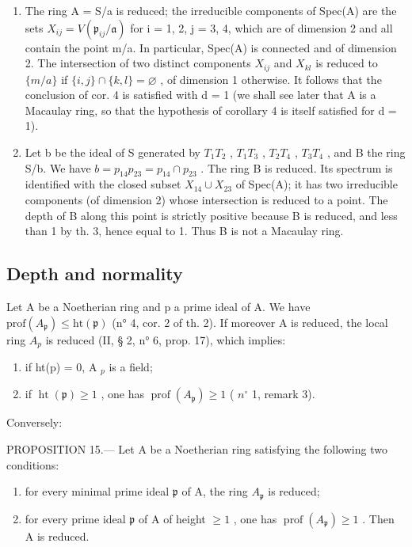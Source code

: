 \begin{enumerate}
\def\labelenumi{\alph{enumi})}
\item
  The ring A = S/a is reduced; the irreducible components of Spec(A) are the sets \(X_{ij} = V(\mathfrak{p}_{ij}/\mathfrak{a})\) for i = 1, 2, j = 3, 4, which are of dimension 2 and all contain the point m/a. In particular, Spec(A) is connected and of dimension 2. The intersection of two distinct components \(X_{ij}\) and \(X_{kl}\) is reduced to \(\{m/a\}\) if \(\{i,j\} \cap \{k,l\} = \varnothing\) , of dimension 1 otherwise. It follows that the conclusion of cor. 4 is satisfied with d = 1 (we shall see later that A is a Macaulay ring, so that the hypothesis of corollary 4 is itself satisfied for d = 1).
\item
  Let b be the ideal of S generated by \(T_{1}T_{2}\) , \(T_{1}T_{3}\) , \(T_{2}T_{4}\) , \(T_{3}T_{4}\) , and B the ring S/b. We have \(b = p_{14}p_{23} = p_{14} \cap p_{23}\) . The ring B is reduced. Its spectrum is identified with the closed subset \(X_{14} \cup X_{23}\) of Spec(A); it has two irreducible components (of dimension 2) whose intersection is reduced to a point. The depth of B along this point is strictly positive because B is reduced, and less than 1 by th. 3, hence equal to 1. Thus B is not a Macaulay ring.
\end{enumerate}

\subsection{Depth and normality}

Let A be a Noetherian ring and p a prime ideal of A. We have \(\text{prof}(A_{\mathfrak{p}}) \leqslant \text{ht}(\mathfrak{p})\) (n° 4, cor. 2 of th. 2). If moreover A is reduced, the local ring \(A_{p}\) is reduced (II, § 2, n° 6, prop. 17), which implies:

\begin{enumerate}
\def\labelenumi{\alph{enumi})}
\item
  if ht(p) = 0, A \(_{p}\) is a field;
\item
  if \(\operatorname{ht}(\mathfrak{p}) \geqslant 1\) , one has \(\operatorname{prof}(A_{\mathfrak{p}}) \geqslant 1\) ( \(n^{\circ}\) 1, remark 3).
\end{enumerate}

Conversely:

PROPOSITION 15.--- Let A be a Noetherian ring satisfying the following two conditions:

\begin{enumerate}
\def\labelenumi{(\roman{enumi})}
\item
  for every minimal prime ideal \(\mathfrak{p}\) of A, the ring \(A_{\mathfrak{p}}\) is reduced;
\item
  for every prime ideal \(\mathfrak{p}\) of A of height \(\geqslant 1\) , one has \(\operatorname{prof}(A_{\mathfrak{p}}) \geqslant 1\) . Then A is reduced.
\end{enumerate}

